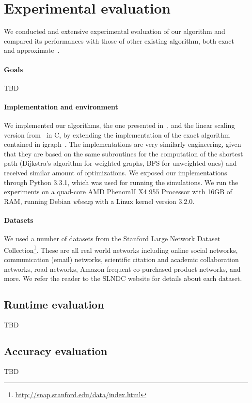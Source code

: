 \section{Experimental evaluation}\label{sec:exper}
We conducted and extensive experimental evaluation of our algorithm and
compared its performances with those of other existing algorithm, both
exact~\citep{Brandes01} and approximate~\citep{BrandesP07,JacobKLPT05}.

\paragraph{Goals} TBD

\paragraph{Implementation and environment}
We implemented our algorithms, the one presented
in~\citep{BrandesP07,JacobKLPT05}, and the linear scaling version
from~\citep{GeisbergerSS08} in C, by extending the implementation of the
exact algorithm~\citep{Brandes01} contained in igraph~\citep{igraph}. The
implementations are very similarly engineering, given that they are based on the
same subroutines for the computation of the shortest path (Dijkstra's algorithm
for weighted graphs, BFS for unweighted ones) and received similar amount of
optimizations. We exposed our implementations through Python 3.3.1, which was
used for running the simulations. We run the experiments on a quad-core AMD
Phenom\texttrademark II X4 955 Processor with 16GB of RAM, running Debian
\emph{wheezy} with a Linux kernel version 3.2.0.

\paragraph{Datasets} We used a number of datasets from the Stanford Large
Network Dataset
Collection\footnote{\url{http://snap.stanford.edu/data/index.html}}. These are
all real world networks including online social networks, communication (email)
networks, scientific citation and academic collaboration networks, road
networks, Amazon frequent co-purchased product networks, and more. We refer the
reader to the SLNDC website for details about each dataset.

\subsection{Runtime evaluation}\label{sec:runtime}
TBD

\subsection{Accuracy evaluation}\label{sec:accuracy}
TBD
